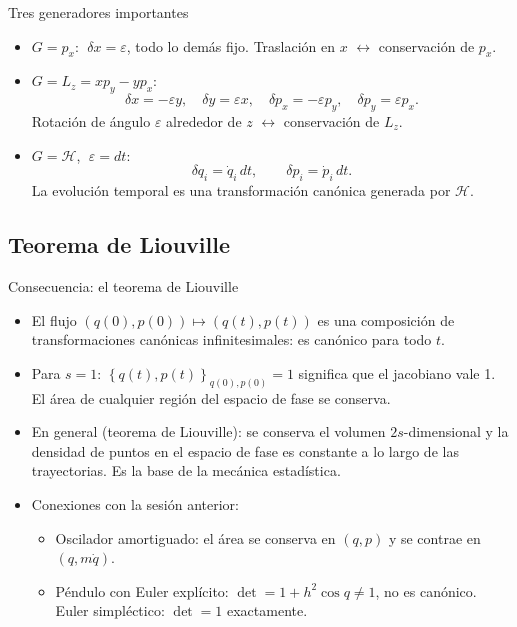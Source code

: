 \documentclass[spanish]{beamer}
\newcommand{\Ham}{\mathcal{H}}               %
\newcommand{\pb}[2]{\left\{#1,#2\right\}}    %
\begin{document}
\begin{frame}{Tres generadores importantes}
\begin{itemize}[<+->]
  \item $G=p_x$: $\;\delta x=\varepsilon$, todo lo demás fijo.
        Traslación en $x$ $\leftrightarrow$ conservación de $p_x$.
  \item $G=L_z=xp_y-yp_x$:
        \[
          \delta x=-\varepsilon y,\quad\delta y=\varepsilon x,\quad
          \delta p_x=-\varepsilon p_y,\quad\delta p_y=\varepsilon p_x .
        \]
        Rotación de ángulo $\varepsilon$ alrededor de $z$ $\leftrightarrow$
        conservación de $L_z$.
  \item $G=\Ham$, $\;\varepsilon=dt$:
        \[
          \delta q_i=\dot q_i\,dt,\qquad\delta p_i=\dot p_i\,dt .
        \]
        \alert{La evolución temporal es una transformación canónica generada por $\Ham$.}
\end{itemize}
\end{frame}

\subsection{Teorema de Liouville}
\begin{frame}{Consecuencia: el teorema de Liouville}
\begin{itemize}[<+->]
  \item El flujo $(q(0),p(0))\mapsto(q(t),p(t))$ es una composición de transformaciones
        canónicas infinitesimales: es canónico para todo $t$.
  \item Para $s=1$: $\pb{q(t)}{p(t)}_{q(0),p(0)}=1$ significa que el jacobiano vale 1.
        \alert{El área de cualquier región del espacio de fase se conserva.}
  \item En general (teorema de Liouville): se conserva el volumen $2s$-dimensional y la
        densidad de puntos en el espacio de fase es constante a lo largo de las
        trayectorias. Es la base de la mecánica estadística.
  \item Conexiones con la sesión anterior:
        \begin{itemize}
          \item Oscilador amortiguado: el área se conserva en $(q,p)$ y se contrae en $(q,m\dot q)$.
          \item Péndulo con Euler explícito: $\det=1+h^2\cos q\neq1$, no es canónico.
                Euler simpléctico: $\det=1$ exactamente.
        \end{itemize}
\end{itemize}
\end{frame}
\end{document}

